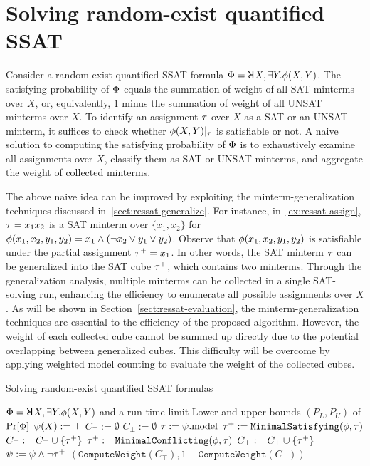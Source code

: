 \section{Solving random-exist quantified SSAT}
\label{sect:ressat-technique}

Consider a random-exist quantified SSAT formula $\Qf=\random{} X,\exists Y.\pf(X,Y)$.
The satisfying probability of $\Phi$ equals the summation of weight of all SAT minterms over $X$, or, equivalently,
$1$ minus the summation of weight of all UNSAT minterms over $X$.
To identify an assignment $\tau$ over $X$ as a SAT or an UNSAT minterm,
it suffices to check whether $\phi(X,Y)|_{\tau}$ is satisfiable or not.
A naive solution to computing the satisfying probability of $\Phi$ is to exhaustively examine all assignments over $X$, classify them as SAT or UNSAT minterms, and aggregate the weight of collected minterms.

The above naive idea can be improved by exploiting the minterm-generalization techniques discussed in~\cref{sect:ressat-generalize}.
For instance, in~\cref{ex:ressat-assign},
$\tau=x_1x_2$ is a SAT minterm over $\{x_1,x_2\}$ for $\phi(x_1,x_2,y_1,y_2)=x_1 \land (\lnot x_2 \lor y_1 \lor y_2)$.
Observe that $\phi(x_1,x_2,y_1,y_2)$ is satisfiable under the partial assignment $\tau^+=x_1$.
In other words, the SAT minterm $\tau$ can be generalized into the SAT cube $\tau^+$, which contains two minterms.
Through the generalization analysis, multiple minterms can be collected in a single SAT-solving run,
enhancing the efficiency to enumerate all possible assignments over $X$.
As will be shown in Section~\ref{sect:ressat-evaluation},
the minterm-generalization techniques are essential to the efficiency of the proposed algorithm.
However, the weight of each collected cube cannot be summed up directly due to the potential overlapping between generalized cubes.
This difficulty will be overcome by applying weighted model counting to evaluate the weight of the collected cubes.

\begin{algorithm}[p]
    \caption{Solving random-exist quantified SSAT formulas}
    \label{alg:ressat}
    \begin{algorithmic}[1]
        \REQUIRE
        $\Qf=\random{} X,\exists Y.\pf(X,Y)$ and a run-time limit \timeout
        \ENSURE
        Lower and upper bounds $(P_L,P_U)$ of $\Pr[\Phi]$
        \STATE $\psi(X) := \top$
        \STATE $C_\top := \emptyset$
        \STATE $C_\bot := \emptyset$
        \STATE $\tau := \psi.\mathrm{model}$
        \IF{($\sat{\pcf{\pf}{\as}}$)}
        \STATE $\tau^+ := \texttt{MinimalSatisfying}(\phi,\tau)$
        \STATE $C_\top := C_\top \cup \{\tau^+\}$
        \ELSE
        \STATE $\tau^+ := \texttt{MinimalConflicting}(\phi,\tau)$
        \STATE $C_\bot := C_\bot \cup \{\tau^+\}$
        \ENDIF
        \STATE $\psi := \psi \land \lnot\tau^+$
        \ENDWHILE
        \RETURN $(\texttt{ComputeWeight}(C_\top),1-\texttt{ComputeWeight}(C_\bot))$
    \end{algorithmic}
\end{algorithm}

